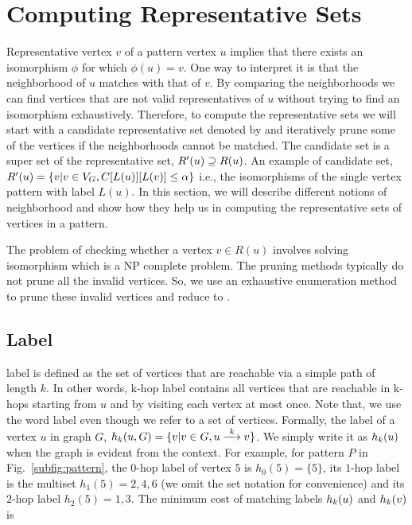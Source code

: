 
\section{Computing Representative Sets} 
\label{sec:representative}
Representative vertex $v$ of a pattern
vertex $u$ implies that there exists an isomorphism $\phi$ for which $\phi(u) =
v$.  One way to interpret it is that the neighborhood of $u$ matches with that
of $v$.  By comparing the neighborhoods we can find vertices that are not valid
representatives of $u$ without trying to find an isomorphism exhaustively.
Therefore, to compute the representative sets we will start with a candidate
representative set denoted by \CR  and iteratively prune some of the vertices if
the neighborhoods cannot be matched.  The candidate set is a super set of the
representative set, $\CR \supseteq \RS$.  An example of candidate set, $ \CR =
\{v| v \in \vg, \matij{C}{L(u)}{L(v)} \leq \alpha \}$ i.e., the isomorphisms of
the single vertex pattern with label $L(u)$.  In this section, we will describe
different notions of neighborhood and show how they help us in computing the
representative sets of vertices in a pattern.

The problem of checking whether a vertex $v \in R(u)$ involves solving
isomorphism which is a NP complete problem. The pruning methods typically do not
prune all the invalid vertices.  So, we use an exhaustive enumeration method to
prune these invalid vertices and reduce \CR to \RS.

 \subsection{\khop Label}
 \khop label is defined as the set of vertices that are reachable via a simple
 path of length $k$.  In other words, k-hop label contains all vertices that are
 reachable in k-hops starting from $u$ and by visiting each vertex at most once.
 Note that, we use the word label even though we refer to a set of vertices.
 Formally, the \khop label of a vertex $u$ in graph $G$, $\khopl{k}{u,G} = \{v |
 v \in G, \kpath{u}{v}{k}\}$.  We simply write it as $\khopl{k}{u}$ when the
 graph is evident from the context.  For example, for pattern $P$ in
 Fig.~\ref{subfig:pattern}, the $0$-hop label of vertex $5$ is $h_0(5) = \{5\}$,
 its $1$-hop label is the multiset $h_1(5) = 2, 4, 6$ (we omit the set notation
 for convenience) and its $2$-hop label $h_2(5) = 1, 3$. The minimum cost of
 matching \khop labels $\khopl{k}{u}$ and $\khopl{k}{v}$ is 

